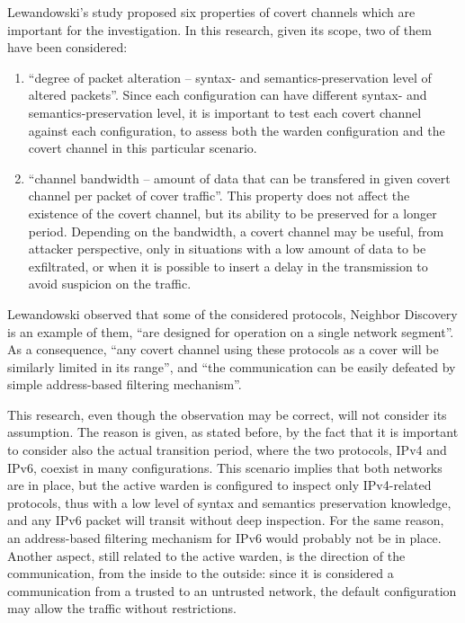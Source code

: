 \documentclass[12pt]{article}
\begin{document}
Lewandowski's study proposed six properties of covert channels which are important for the investigation. In this research, given its scope, two of them have been considered:
\vspace{-10pt}
\begin{enumerate}[noitemsep,topsep=0pt,partopsep=0pt]
 \item ``degree of packet alteration – syntax- and semantics-preservation level of altered packets''. Since each configuration can have different syntax- and semantics-preservation level, it is important to test each covert channel against each configuration, to assess both the warden configuration and the covert channel in this particular scenario\cite{lewandowski}.
 \item ``channel bandwidth – amount of data that can be transfered in given covert channel per packet of cover traffic''. This property does not affect the existence of the covert channel, but its ability to be preserved for a longer period. Depending on the bandwidth, a covert channel may be useful, from attacker perspective, only in situations with a low amount of data to be exfiltrated, or when it is possible to insert a delay in the transmission to avoid suspicion on the traffic\cite{lewandowski}.
\end{enumerate}

Lewandowski observed that some of the considered protocols, Neighbor Discovery is an example of them, ``are designed for operation on a single network segment''. As a consequence, ``any covert channel using these protocols as a cover will be similarly limited in its range'', and ``the communication can be easily defeated by simple address-based filtering mechanism''\cite{lewandowski}.

This research, even though the observation may be correct, will not consider its assumption. The reason is given, as stated before, by the fact that it is important to consider also the actual transition period, where the two protocols, IPv4 and IPv6, coexist in many configurations. This scenario implies that both networks are in place, but the active warden is configured to inspect only IPv4-related protocols, thus with a low level of syntax and semantics preservation knowledge, and any IPv6 packet will transit without deep inspection. For the same reason, an address-based filtering mechanism for IPv6 would probably not be in place. Another aspect, still related to the active warden, is the direction of the communication, from the inside to the outside: since it is considered a communication from a trusted to an untrusted network, the default configuration may allow the traffic without restrictions.
\end{document}
